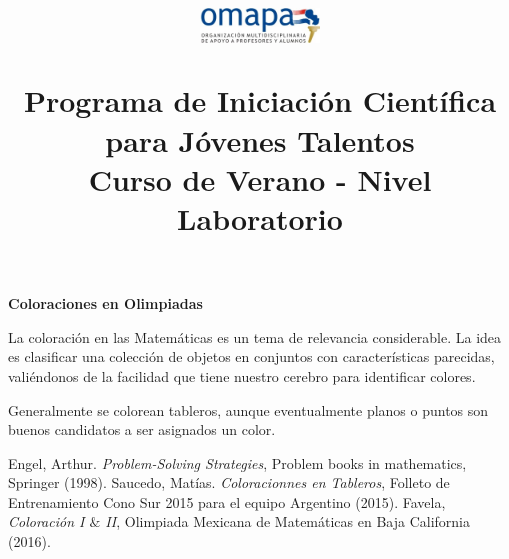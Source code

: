 \documentclass{article}
\title{
\begin{center}
	\includegraphics[width=120px, height=40px]{imgs/omapa.jpg}
	\vspace{1cm}
\end{center}
Programa de Iniciaci\'on Cient\'ifica para J\'ovenes Talentos \\ \Large Curso de Verano - Nivel Laboratorio
}
\date{}
\begin{document}
	\maketitle


	\begin{center}
		{\bfseries {\LARGE Coloraciones en Olimpiadas}}
	\end{center}
	

	


	La coloraci\'on en las Matem\'aticas es un tema de relevancia considerable. La idea es clasificar una colecci\'on de objetos en conjuntos con caracter\'isticas parecidas, vali\'endonos de la facilidad que tiene nuestro cerebro para identificar colores. 
	
	Generalmente se colorean tableros, aunque eventualmente planos o puntos son buenos candidatos a ser asignados un color.
	
	
	
	
	
	
	
	\begin{thebibliography}{99}
	
	
	 Engel, Arthur. \emph{Problem-Solving Strategies}, Problem books in mathematics, Springer (1998).
	 Saucedo, Mat\'ias. \emph{Coloracionnes en Tableros}, Folleto de Entrenamiento Cono Sur 2015 para el equipo Argentino (2015).
	 Favela, \emph{Coloraci\'on I $\&$ II}, Olimpiada Mexicana de Matem\'aticas en Baja California (2016).
	
	
	\end{thebibliography}
\end{document}
